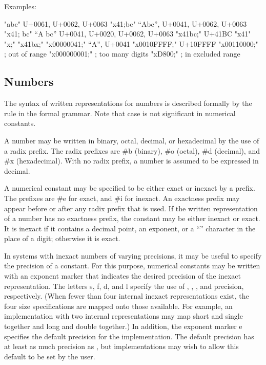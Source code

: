 Examples:

\begin{schemenoindent}
"abc" \ev  \textrm{U+0061, U+0062, U+0063}
"\backwhack{}x41;bc" \ev  \textrm{``Abc'', U+0041, U+0062, U+0063}
"\backwhack{}x41; bc" \ev  \textrm{``A bc''}
\>\>\textrm{U+0041, U+0020, U+0062, U+0063}
"\backwhack{}x41bc;" \ev  \textrm{U+41BC}
"\backwhack{}x41" \ev {}
"\backwhack{}x;" \ev {}
"\backwhack{}x41bx;" \ev {}
"\backwhack{}x00000041;" \ev  \textrm{``A'', U+0041}
"\backwhack{}x0010FFFF;" \ev \textrm{U+10FFFF}
"\backwhack{}x00110000;" \ev  {}
\>\>; \textrm{out of range}
"\backwhack{}x000000001;" \ev {}
\>\>; \textrm{too many digits}
"\backwhack{}xD800;" \ev {}
\>\>; \textrm{in excluded range}
\end{schemenoindent}
  
\subsection{Numbers}
\label{numbernotations}

The syntax of written representations for numbers is described
formally by the  rule in the formal grammar.  Note that
case is not significant in numerical constants.

A number may be written in binary, octal, decimal, or
hexadecimal by the use of a radix prefix.  The radix prefixes are {\cf
\#b} (binary), {\cf \#o} (octal), {\cf
\#d} (decimal), and {\cf \#x} (hexadecimal).  With
no radix prefix, a number is assumed to be expressed in decimal.

A
numerical constant may be specified to be either exact or
inexact by a prefix.  The prefixes are {\cf \#e}
for exact, and {\cf \#i} for inexact.  An exactness
prefix may appear before or after any radix prefix that is used.  If
the written representation of a number has no exactness prefix, the
constant may be either inexact or exact.  It is
inexact if it contains a decimal point, an
exponent, or a ``\sharpsign'' character in the place of a digit;
otherwise it is exact.

In systems with inexact numbers
of varying precisions, it may be useful to specify
the precision of a constant.  For this purpose, numerical constants
may be written with an exponent marker that indicates the
desired precision of the inexact
representation.  The letters {\cf s}, {\cf f},
{\cf d}, and {\cf l} specify the use of , ,
, and  precision, respectively.  (When fewer
than four internal
inexact
representations exist, the four size
specifications are mapped onto those available.  For example, an
implementation with two internal representations may map short and
single together and long and double together.)  In addition, the
exponent marker {\cf e} specifies the default precision for the
implementation.  The default precision has at least as much precision
as , but
implementations may wish to allow this default to be set by the user.

